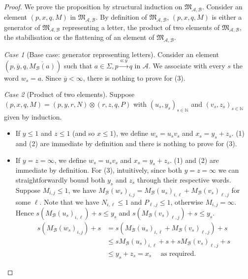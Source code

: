 \documentclass[10pt,a4paper]{amsart}
\theoremstyle{definition}
\numberwithin{equation}{section}
\theoremstyle{remark}
\newtheorem{case}{Case}
\newcommand{\N}{\mathbb{N}}
\newcommand{\ideal}{\mathfrak{M}}
\newcommand{\autA}{\mathcal{A}}
\newcommand{\autB}{\mathcal{B}}
\theoremstyle{remark}
\begin{document}
\begin{proof}
We prove the proposition by structural induction on $\ideal_{\autA,\autB}$. Consider an element $(p,x,q,M)$ in $\ideal_{\autA,\autB}$. By definition of $\ideal_{\autA,\autB}$, $(p,x,q,M)$ is either a generator of $\ideal_{\autA,\autB}$ representing a letter, the product of two elements of $\ideal_{\autA,\autB}$, the stabilisation or the flattening of an element of $\ideal_{\autA,\autB}$.

\begin{case}[Base case: generator representing letters]
Consider an element $(p,\overline{y},q,\overline{M_\autB(a)})$ such that  $a\in \Sigma, p\xrightarrow{a:y}q \text{ in } \autA$. We associate with every $s$ the word $w_s = a$. Since $\overline{y} < \infty$, there is nothing to prove for (3).
\end{case}

\begin{case}[Product of two elements]

Suppose $(p,x,q,M) = (p,y,r,N)\otimes (r,z,q,P)$ with $(u_s,y_s)_{s\in\N}$ and $(v_s,z_s)_{s\in\N}$ given by induction. 
\begin{itemize}
\item If $y\le 1$ and $z\le 1$ (and so $x \le 1$), we define $w_s = u_sv_s$ and $x_s = y_s+z_s$. (1) and (2) are immediate by definition and there is nothing to prove for (3).

\item If $y=z=\infty$, we define $w_s = u_sv_s$ and $x_s = y_s+z_s$. (1) and (2) are immediate by definition. For (3), intuitively, since both $y=z=\infty$ we can straightforwardly bound both $y_s$ and $z_s$ through their respective words. Suppose $M_{i,j} \le 1$, we have $M_\autB(w_s)_{i,j} = M_\autB(u_s)_{i,\ell} + M_\autB(v_s)_{\ell,j}$ for some $\ell$.
Note that we have $N_{i,\ell} \le 1$ and $P_{\ell, j} \le 1$, otherwise $M_{i,j} = \infty$. Hence $s(M_\autB(u_s)_{i,\ell})+ s \le y_s$ and $s(M_\autB(v_s)_{\ell,j})+ s \le y_s$.
\begin{align*}
s(M_\autB(w_s)_{i,j}) + s & = s(M_\autB(u_s)_{i,\ell} + M_\autB(v_s)_{\ell,j} ) + s
\\ &\le  sM_\autB(u_s)_{i,\ell} + s +  sM_\autB(v_s)_{\ell,j} + s
\\&\le y_s + z_s  = x_s \quad \text{ as required.}
\end{align*}


\end{itemize}
\end{case}
\end{proof}
\end{document}
